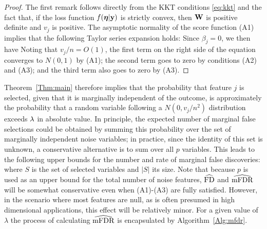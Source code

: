 \begin{proof}
  The first remark follows directly from the KKT conditions \eqref{eq:kkt} and the fact that, if the loss function $f(\boldsymbol{\eta}|\mathbf{y})$ is strictly convex, then $\mathbf{W}$ is positive definite and $v_j$ is positive.  The asymptotic normality of the score function (A1) implies that the following Taylor series expansion holds:
Since $\beta_j=0$, we then have
Noting that $v_j/n=O(1)$, the first term on the right side of the equation converges to $N(0,1)$ by (A1); the second term goes to zero by conditions (A2) and (A3); and the third term also goes to zero by (A3).
\end{proof}

Theorem~\ref{Thm:main} therefore implies that the probability that feature $j$ is selected, given that it is marginally independent of the outcome, is approximately the probability that a random variable following a $N(0, v_j/n^2)$ distribution exceeds $\lambda$ in absolute value.
In principle, the expected number of marginal false selections could be obtained by summing this probability over the set of marginally independent noise variables; in practice, since the identity of this set is unknown, a conservative alternative is to sum over all $p$ variables.
This leads to the following upper bounds for the number and rate of marginal false discoveries:
where $S$ is the set of selected variables and $|S|$ its size.  Note that because $p$ is used as an upper bound for the total number of noise features, $\widehat{\textrm{FD}}$ and $\widehat{\textrm{mFDR}}$ will be somewhat conservative even when (A1)-(A3) are fully satisfied.  However, in the scenario where most features are null, as is often presumed in high dimensional applications, this effect will be relatively minor.  For a given value of $\lambda$ the process of calculating $\widehat{\textrm{mFDR}}$ is encapsulated by Algorithm~\ref{Alg:mfdr}.


